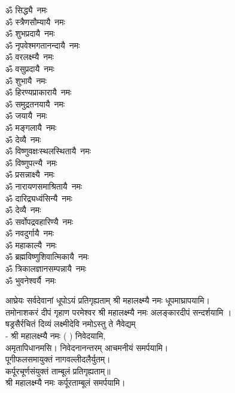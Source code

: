 \begin{multicols}{2}
\begin{flushleft}
ॐ सिद्ध्यै~नमः\\
ॐ स्त्रैणसौम्यायै~नमः\\
ॐ शुभप्रदायै~नमः\\
ॐ नृपवेश्मगतानन्दायै~नमः\\
ॐ वरलक्ष्म्यै~नमः\\
ॐ वसुप्रदायै~नमः\hfill{}\\
ॐ शुभायै~नमः\\
ॐ हिरण्यप्राकारायै~नमः\\
ॐ समुद्रतनयायै~नमः\\
ॐ जयायै~नमः\\
ॐ मङ्गलायै~नमः\\
ॐ देव्यै~नमः\\
ॐ विष्णुवक्षःस्थलस्थितायै~नमः\\
ॐ विष्णुपत्न्यै~नमः\\
ॐ प्रसन्नाक्ष्यै~नमः\\
ॐ नारायणसमाश्रितायै~नमः\hfill{}\\
ॐ दारिद्र्यध्वंसिन्यै~नमः\\
ॐ देव्यै~नमः\\
ॐ सर्वोपद्रवहारिण्यै~नमः\\
ॐ नवदुर्गायै~नमः\\
ॐ महाकाल्यै~नमः\\
ॐ ब्रह्मविष्णुशिवात्मिकायै~नमः\\
ॐ त्रिकालज्ञानसम्पन्नायै~नमः\\
ॐ भुवनेश्वर्यै~नमः\\
\end{flushleft}
\end{multicols}

{आघ्रेयः सर्वदेवानां धूपोऽयं प्रतिगृह्यताम्}
श्री महालक्ष्म्यै नमः धूपमाघ्रापयामि।\\
 
{तमोनाशकरं दीपं गृहाण परमेश्वर}
श्री महालक्ष्म्यै नमः अलङ्कारदीपं सन्दर्शयामि ।\\

{षड्रसैर्रचितं दिव्यं लक्ष्मीदेवि नमोऽस्तु ते}
नैवेद्यम्\\
- श्री महालक्ष्म्यै नमः (	) निवेदयामि, \\
अमृतापिधानमसि। निवेदनानन्तरम् आचमनीयं समर्पयामि।\\

पूगीफलसमायुक्तं नागवल्लीदलैर्युतम्।\\
कर्पूरचूर्णसंयुक्तं ताम्बूलं प्रतिगृह्यताम्॥\\
श्री महालक्ष्म्यै नमः कर्पूरताम्बूलं समर्पयामि।\\

